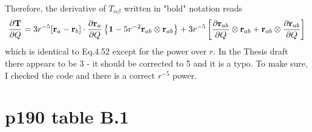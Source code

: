 \documentclass{exam}
\newcommand{\fderiv}[2]{\ensuremath{
\frac{\partial #1}{\partial #2}}}
\begin{document}
\begin{questions}
\begin{solution}
Therefore, the derivative of $T_{\alpha\beta}$ written in "bold" notation
reads
%
\begin{equation}
 \fderiv{{\bf T}}{Q} = 3 r^{-5} [ {\bf r}_a - {\bf r}_b ] \cdot \fderiv{{\bf r}_a}{Q} 
 \left\{ 
   {\bf 1} - 5 r^{-2} {\bf r}_{ab} \otimes {\bf r}_{ab}
 \right\}
 + 
 3r^{-5} \left[ \fderiv{{\bf r}_{ab}}{Q} \otimes {\bf r}_{ab}  + {\bf r}_{ab} \otimes \fderiv{{\bf r}_{ab}}{Q} \right]
\end{equation}
%
which is identical to Eq.4.52 except for the power over $r$. 
In the Thesis draft there appears to be 3 - it should be corrected to 5 and
it is a typo. To make sure, I checked the code and there is a correct $r^{-5}$
power.

\end{solution}

\end{questions}

\section{p190 table B.1}
\end{document}
